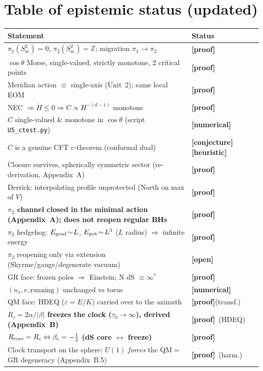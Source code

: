 \documentclass[11pt]{article}
\newcommand{\preuve}{{\small\textbf{[proof]}}}
\newcommand{\num}{{\small\textbf{[numerical]}}}
\newcommand{\conj}{{\small\textbf{[conjecture]}}}
\newcommand{\heur}{{\small\textbf{[heuristic]}}}
\newcommand{\ouv}{{\small\textbf{[open]}}}
\newcommand{\Npole}{\mathrm{N}}
\newcommand{\Stwo}{S^2_{\text{sc}}}
\theoremstyle{definition}
\begin{document}
\section*{Table of epistemic status (updated)}
\begin{center}\footnotesize
\renewcommand{\arraystretch}{1.05}
\begin{tabular}{p{11.0cm} l}
\toprule
\textbf{Statement} & \textbf{Status}\\
\midrule
$\pi_1(\Stwo)=0$, $\pi_2(\Stwo)=\mathbb{Z}$; migration $\pi_1\to\pi_2$ & \preuve\\
$\cos\theta$ Morse, single-valued, strictly monotone, 2 critical points & \preuve\\
Meridian action $\equiv$ single-axis (Unit~2); same local EOM & \preuve\\
NEC $\Rightarrow\dot H\le0\Rightarrow C\propto H^{-(d-1)}$ monotone & \preuve\\
$C$ single-valued \& monotone in $\cos\theta$ (script \texttt{U5\_ctest.py}) & \num\\
$C$ is a genuine CFT c-theorem (conformal dual) & \conj\,\heur\\
Closure survives, spherically symmetric sector (re-derivation, Appendix~A) & \preuve\\
Derrick: interpolating profile unprotected (North on max of $V$) & \preuve\\
\textbf{$\pi_2$ channel closed in the minimal action (Appendix~A); does not reopen regular BHs} & \preuve\\
$\pi_2$ hedgehog: $E_{\rm grad}\!\sim\!L$, $E_{\rm pot}\!\sim\!L^3$ ($L$ radius) $\Rightarrow$ infinite energy & \preuve\\
$\pi_2$ reopening only via extension (Skyrme/gauge/degenerate vacuum) & \ouv\\
GR face: frozen poles $\Rightarrow$ Einstein; $\Npole$ dS $\equiv\infty^\ast$ & \preuve\\
$(n_s,r,\text{running})$ unchanged vs torus & \num\\
QM face: HDEQ ($\varepsilon=E/K$) carried over to the azimuth & \preuve(transf.)\\
\textbf{$R_c=2\alpha/|\beta|$ freezes the clock ($\tau_0\!\to\!\infty$), derived (Appendix~B)} & \preuve\ (HDEQ)\\
\textbf{$R_{\rm core}=R_c\Leftrightarrow\beta_c=-\tfrac13$ (dS core $\leftrightarrow$ freeze)} & \preuve\\
Clock transport on the sphere: $U(1)$ \emph{forces} the QM$=$GR degeneracy (Appendix~B.5) & \preuve\ (harm.)\\

\end{tabular}
\end{center}
\end{document}
